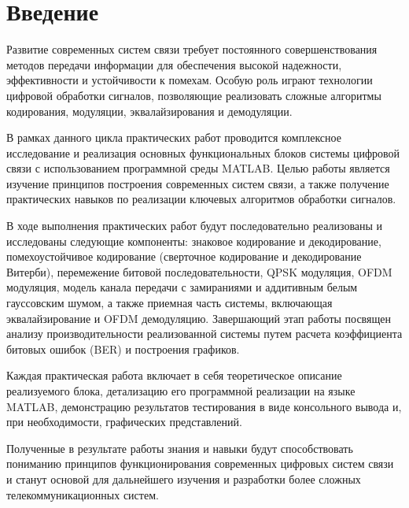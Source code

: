 \chapter*{Введение}
\label{ch:intro}

Развитие современных систем связи требует постоянного совершенствования методов передачи информации для обеспечения высокой надежности, эффективности и устойчивости к помехам. Особую роль играют технологии цифровой обработки сигналов, позволяющие реализовать сложные алгоритмы кодирования, модуляции, эквалайзирования и демодуляции.

В рамках данного цикла практических работ проводится комплексное исследование и реализация основных функциональных блоков системы цифровой связи с использованием программной среды MATLAB. Целью работы является изучение принципов построения современных систем связи, а также получение практических навыков по реализации ключевых алгоритмов обработки сигналов.

В ходе выполнения практических работ будут последовательно реализованы и исследованы следующие компоненты: знаковое кодирование и декодирование, помехоустойчивое кодирование (сверточное кодирование и декодирование Витерби), перемежение битовой последовательности, QPSK модуляция, OFDM модуляция, модель канала передачи с замираниями и аддитивным белым гауссовским шумом, а также приемная часть системы, включающая эквалайзирование и OFDM демодуляцию. Завершающий этап работы посвящен анализу производительности реализованной системы путем расчета коэффициента битовых ошибок (BER) и построения графиков.

Каждая практическая работа включает в себя теоретическое описание реализуемого блока, детализацию его программной реализации на языке MATLAB, демонстрацию результатов тестирования в виде консольного вывода и, при необходимости, графических представлений.

Полученные в результате работы знания и навыки будут способствовать пониманию принципов функционирования современных цифровых систем связи и станут основой для дальнейшего изучения и разработки более сложных телекоммуникационных систем.

\endinput